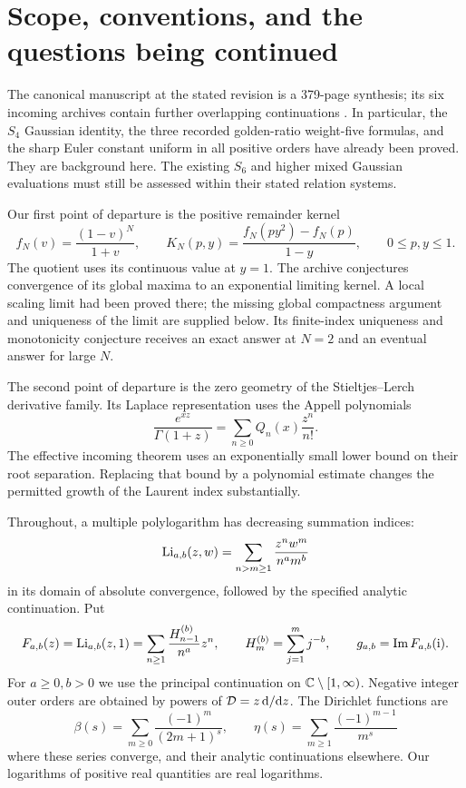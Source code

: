 \section{Scope, conventions, and the questions being continued}
\label{sec:intro}
The canonical manuscript at the stated revision is a 379-page synthesis;
its six incoming archives contain further overlapping continuations
\cite{ProveIt,IncomingSharp,IncomingBounds,IncomingUniform,IncomingMixed,
IncomingRadial,IncomingDepth}. In particular, the $S_4$ Gaussian identity,
the three recorded golden-ratio weight-five formulas, and the sharp
Euler constant uniform in all positive orders have already been proved.
They are background here. The existing $S_6$ and higher mixed Gaussian
evaluations must still be assessed within their stated relation systems.

Our first point of departure is the positive remainder kernel
\begin{equation}\label{eq:intro-kernel}
 f_N(v)=\frac{(1-v)^N}{1+v},\qquad
 K_N(p,y)=\frac{f_N(py^2)-f_N(p)}{1-y},\qquad 0\le p,y\le1.
\end{equation}
The quotient uses its continuous value at $y=1$.
The archive \cite[Section 8]{IncomingSharp} conjectures convergence of
its global maxima to an exponential limiting kernel. A local scaling
limit had been proved there; the missing global compactness argument
and uniqueness of the limit are supplied below. Its finite-index
uniqueness and monotonicity conjecture receives an exact answer at
$N=2$ and an eventual answer for large $N$.

The second point of departure is the zero geometry of the Stieltjes--Lerch
derivative family. Its Laplace representation uses the Appell polynomials
\[
 \frac{e^{xz}}{\Gamma(1+z)}
   =\sum_{n\ge0}Q_n(x)\frac{z^n}{n!}.
\]
The effective incoming theorem \cite[Section 4]{IncomingUniform}
uses an exponentially small lower bound on their root separation.
Replacing that bound by a polynomial estimate changes the permitted
growth of the Laurent index substantially.

Throughout, a multiple polylogarithm has decreasing summation indices:
\[
 \operatorname{Li}_{a,b}(z,w)=\sum_{n>m\ge1}\frac{z^nw^m}{n^am^b}
\]
in its domain of absolute convergence, followed by the specified analytic
continuation. Put
\begin{equation}\label{eq:F-def}
 F_{a,b}(z)=\operatorname{Li}_{a,b}(z,1)
   =\sum_{n\ge1}\frac{H_{n-1}^{(b)}}{n^a}z^n,
 \qquad H_m^{(b)}=\sum_{j=1}^m j^{-b},\qquad
 g_{a,b}=\operatorname{Im} F_{a,b}(\mathrm i).
\end{equation}
For $a\ge0,b>0$ we use the principal continuation on
$\mathbb C\setminus[1,\infty)$. Negative integer outer orders are obtained
by powers of $\mathcal D=z\,\mathrm d/\mathrm dz$. The Dirichlet functions are
\[
 \beta(s)=\sum_{m\ge0}\frac{(-1)^m}{(2m+1)^s},\qquad
 \eta(s)=\sum_{m\ge1}\frac{(-1)^{m-1}}{m^s}
\]
where these series converge, and their analytic continuations elsewhere.
Our logarithms of positive real quantities are real logarithms.

